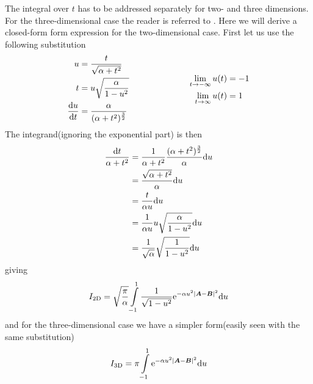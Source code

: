     The integral over $t$ has to be addressed separately for two- and three
    dimensions. For the three-dimensional case the reader is referred to
    \cite{HelgakerTaylorGauss}. Here we will derive a closed-form form
    expression for the two-dimensional case. First let us use the following
    substitution
        \begin{equation}
            \begin{aligned}
                u &= \frac{t}{\sqrt{\alpha+t^2}} \\
                t &= u\sqrt{\frac{\alpha}{1-u^2}} \\
                \frac{\mathrm{d} u}{\mathrm{d} t} &= \frac{\alpha}{(\alpha +
                t^2)^{\frac{3}{2}}}
            \end{aligned}
            \hspace{2.5cm}
            \begin{aligned}
                \lim\limits_{t\rightarrow -\infty} u(t) &= -1 \\ 
                \lim\limits_{t\rightarrow \infty} u(t) &= 1
            \end{aligned}
            \label{eq:uSubs1}
        \end{equation}
    The integrand(ignoring the exponential part) is then
        \begin{align}
            \frac{\mathrm{d} t}{\alpha + t^2} &= \frac{1}{\alpha + t^2} \frac{(\alpha +
            t^2)^{\frac{3}{2}}}{\alpha} \mathrm{d} u \nonumber \\
            &= \frac{\sqrt{\alpha + t^2}}{\alpha} \mathrm{d} u \nonumber \\
            &= \frac{t}{\alpha u} \mathrm{d} u \nonumber \\
            &= \frac{1}{\alpha u} u\sqrt{\frac{\alpha}{1-u^2}} \mathrm{d} u \nonumber \\
            &= \frac{1}{\sqrt{\alpha}}\sqrt{\frac{1}{1-u^2}} \mathrm{d} u
        \end{align}
    giving
        \begin{align}
            I_{\text{2D}} = \sqrt{\frac{\pi}{\alpha}}\int\limits^1_{-1}
            \frac{1}{\sqrt{1-u^2}} \mathrm{e}^{-\alpha u^2\abs{\boldsymbol{{A}} - \boldsymbol{{B}}}^2}
            \mathrm{d} u
            \label{eq:oneElectron2D}
        \end{align}
    and for the three-dimensional case we have a simpler form(easily seen with
    the same substitution)
        \begin{align}
            I_{\text{3D}} = \pi\int\limits^1_{-1} \mathrm{e}^{-\alpha u^2\abs{\boldsymbol{{A}}
            - \boldsymbol{{B}}}^2} \mathrm{d} u
            \label{eq:oneElectron3D}
        \end{align}
